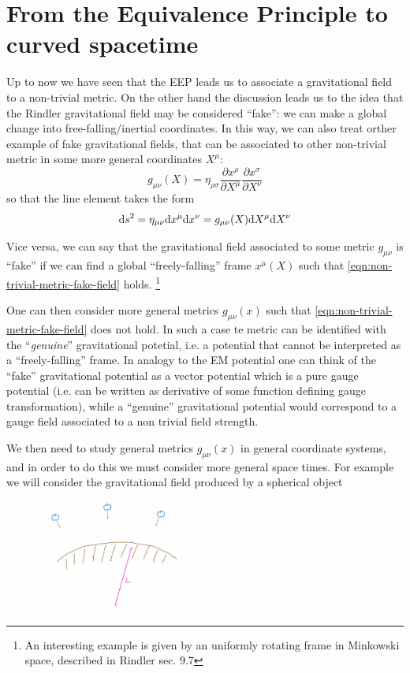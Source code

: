 \documentclass[../main/main.tex]{subfiles}
\begin{document}
\section{From the Equivalence Principle to curved spacetime}
Up to now we have seen that the EEP leads us to associate a gravitational field to a non-trivial metric. On the other hand the discussion leads us to the idea that the Rindler gravitational field may be considered ``fake'': we can make a global change into free-falling/inertial coordinates. In this way, we can also treat orther example of fake gravitational fields, that can be associated to other non-trivial metric in some more general coordinates $X^\mu$:
\begin{equation}\label{eqn:non-trivial-metric-fake-field}
g_{\mu\nu}(X)=\eta_{\rho\sigma}\frac{\partial x^\rho}{\partial X^\mu}\frac{\partial x^\sigma}{\partial X^\nu}
\end{equation}
so that  the line element takes the form
\[\textup{d} s^2=\eta_{\mu\nu}\textup{d} x^\mu \textup{d} x^\nu=g_{\mu\nu}(X)\textup{d} X^\mu\textup{d} X^\nu\]

Vice versa, we can say that the gravitational field associated to some metric $g_{\mu\nu}$ is ``fake'' if we can find a global ``freely-falling'' frame $x^\mu(X)$ such that \eqref {eqn:non-trivial-metric-fake-field} holds. 
\footnote{An interesting example is given by an uniformly rotating frame in Minkowski space, described in \textsf{Rindler sec. 9.7}}

One can then consider more general metrics $g_{\mu\nu}(x)$ such that  \eqref {eqn:non-trivial-metric-fake-field} does not hold. In such a case te metric can be identified with the ``\emph{genuine}'' gravitational potetial, i.e. a potential that cannot be interpreted as a ``freely-falling'' frame. 
In analogy to the EM potential one can think of the ``fake'' gravitational potential as a vector potential which is a pure gauge potential (i.e. can be written as derivative of some function defining gauge transformation), while a ``genuine'' gravitational potential would correspond to a gauge field associated to a non trivial field strength.

We then need to study general metrics $g_{\mu\nu}(x)$ in general coordinate systems, and in order to do this we must consider more general space times. For example we will consider the gravitational field produced by a spherical object

\begin{figure}[H]
\centering
\includegraphics[width=5cm]{../img/grav-field-spheric-apples.jpg}
\end{figure}
\end{document}
